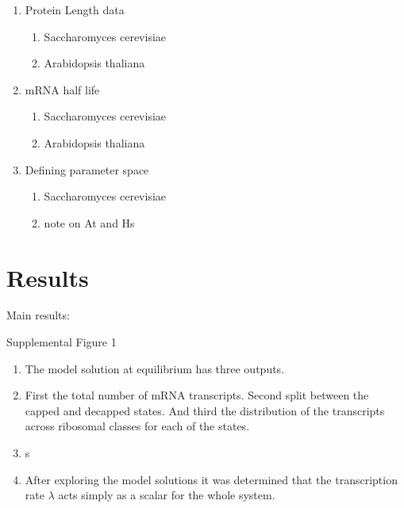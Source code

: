 \documentclass[review]{elsarticle}
\begin{document}
\begin{enumerate}
	 \item Protein Length data
	\begin{enumerate}
		\item Saccharomyces cerevisiae
		\item Arabidopsis thaliana
	\end{enumerate}
	 \item mRNA half life
	\begin{enumerate}
		\item Saccharomyces cerevisiae
		\item Arabidopsis thaliana
	\end{enumerate}
	\item Defining parameter space
	\begin{enumerate}
		\item Saccharomyces cerevisiae
		\item note on At and Hs
	\end{enumerate}
\end{enumerate}


\section{Results}

Main results: 



Supplemental Figure 1
\begin{enumerate}
	\item The model solution at equilibrium has three outputs.
	\item First the total number of mRNA transcripts.  Second split between the capped and decapped states. And third the distribution of the transcripts across ribosomal classes for each of the states.
	\item  s

	\item After exploring the model solutions it was determined that the transcription rate $\lambda$ acts simply as a scalar for the whole system. 

\end{enumerate}
\end{document}
